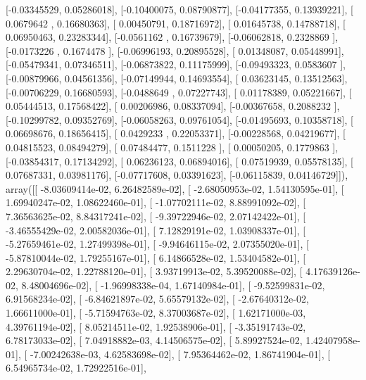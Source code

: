 \documentclass{article}
\begin{document}
       [-0.03345529,  0.05286018],
       [-0.10400075,  0.08790877],
       [-0.04177355,  0.13939221],
       [ 0.0679642 ,  0.16680363],
       [ 0.00450791,  0.18716972],
       [ 0.01645738,  0.14788718],
       [ 0.06950463,  0.23283344],
       [-0.0561162 ,  0.16739679],
       [-0.06062818,  0.2328869 ],
       [-0.0173226 ,  0.1674478 ],
       [-0.06996193,  0.20895528],
       [ 0.01348087,  0.05448991],
       [-0.05479341,  0.07346511],
       [-0.06873822,  0.11175999],
       [-0.09493323,  0.0583607 ],
       [-0.00879966,  0.04561356],
       [-0.07149944,  0.14693554],
       [ 0.03623145,  0.13512563],
       [-0.00706229,  0.16680593],
       [-0.0488649 ,  0.07227743],
       [ 0.01178389,  0.05221667],
       [ 0.05444513,  0.17568422],
       [ 0.00206986,  0.08337094],
       [-0.00367658,  0.2088232 ],
       [-0.10299782,  0.09352769],
       [-0.06058263,  0.09761054],
       [-0.01495693,  0.10358718],
       [ 0.06698676,  0.18656415],
       [ 0.0429233 ,  0.22053371],
       [-0.00228568,  0.04219677],
       [ 0.04815523,  0.08494279],
       [ 0.07484477,  0.1511228 ],
       [ 0.00050205,  0.1779863 ],
       [-0.03854317,  0.17134292],
       [ 0.06236123,  0.06894016],
       [ 0.07519939,  0.05578135],
       [ 0.07687331,  0.03981176],
       [-0.07717608,  0.03391623],
       [-0.06115839,  0.04146729]]), array([[ -8.03609414e-02,   6.26482589e-02],
       [ -2.68050953e-02,   1.54130595e-01],
       [  1.69940247e-02,   1.08622460e-01],
       [ -1.07702111e-02,   8.88991092e-02],
       [  7.36563625e-02,   8.84317241e-02],
       [ -9.39722946e-02,   2.07142422e-01],
       [ -3.46555429e-02,   2.00582036e-01],
       [  7.12829191e-02,   1.03908337e-01],
       [ -5.27659461e-02,   1.27499398e-01],
       [ -9.94646115e-02,   2.07355020e-01],
       [ -5.87810044e-02,   1.79255167e-01],
       [  6.14866528e-02,   1.53404582e-01],
       [  2.29630704e-02,   1.22788120e-01],
       [  3.93719913e-02,   5.39520088e-02],
       [  4.17639126e-02,   8.48004696e-02],
       [ -1.96998338e-04,   1.67140984e-01],
       [ -9.52599831e-02,   6.91568234e-02],
       [ -6.84621897e-02,   5.65579132e-02],
       [ -2.67640312e-02,   1.66611000e-01],
       [ -5.71594763e-02,   8.37003687e-02],
       [  1.62171000e-03,   4.39761194e-02],
       [  8.05214511e-02,   1.92538906e-01],
       [ -3.35191743e-02,   6.78173033e-02],
       [  7.04918882e-03,   4.14506575e-02],
       [  5.89927524e-02,   1.42407958e-01],
       [ -7.00242638e-03,   4.62583698e-02],
       [  7.95364462e-02,   1.86741904e-01],
       [  6.54965734e-02,   1.72922516e-01],
\end{document}
